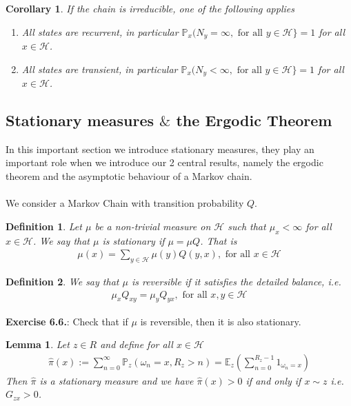 \documentclass[11pt,a4paper, final]{article}
\newtheorem{lem}{Lemma}[section]
\newtheorem{cor}{Corollary}[section]
\newtheorem{defn}{Definition}[section]
\theoremstyle{definition}
\begin{document}
\begin{cor} If the chain is irreducible, one of the following applies
\begin{enumerate}
\item All states are recurrent, in particular $\mathbb{P}_x( N_y = \infty, \text{ for all } y \in \mathcal{H} \rbrace = 1$ for all $x \in \mathcal{H}$.
\item All states are transient, in particular $\mathbb{P}_x( N_y < \infty, \text{ for all } y \in \mathcal{H} \rbrace = 1$ for all $x \in \mathcal{H}$. 
\end{enumerate}
\end{cor}
\newpage
\subsection{Stationary measures $\&$ the Ergodic Theorem}
In this important section we introduce stationary measures, they play an important role when we introduce our 2 central results, namely the ergodic theorem and the asymptotic behaviour of a Markov chain. \\\\
We consider a Markov Chain with transition probability $Q$. 
\begin{defn} Let $\mu$ be a non-trivial measure on $\mathcal{H}$ such that $\mu_x< \infty$ for all $x \in \mathcal{H}$. We say that $\mu$ is stationary if $\mu = \mu Q$.  That is
\begin{align*}
\mu (x) =  \sum_{y \in \mathcal{H}} \mu(y) Q(y,x), \text{ for all } x \in \mathcal{H}
\end{align*}
\end{defn}
\begin{defn} We say that $\mu$ is reversible if it satisfies the detailed balance, i.e. 
\begin{align*}
\mu_x Q_{xy} = \mu_y Q_{yx}, \text{ for all } x,y \in  \mathcal{H}
\end{align*}
\end{defn}
\noindent \textbf{Exercise 6.6.}: Check that if $\mu$ is reversible, then it is also stationary. 
\begin{lem} Let $z \in R$ and define for all $x \in \mathcal{H}$
\begin{align*}
\hat{\pi}(x):= \sum_{n=0}^\infty \mathbb{P}_z ( \omega_n =x, R_z >n ) = \mathbb{E}_z \left( \sum_{n=0}^{R_z-1} 1_{ \omega_n=x} \right)
\end{align*}
Then $\hat{\pi}$ is a stationary measure and we have $\hat{\pi}(x) >0 $ if and only if $x \sim z$ i.e. $G_{zx}>0$. 
\end{lem}
\end{document}
